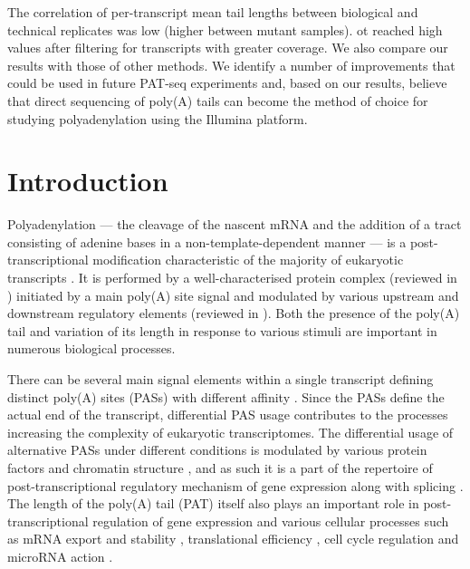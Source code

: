 \documentclass[10pt]{article}
\begin{document}
The correlation of per-transcript mean tail lengths between biological and technical replicates was low (higher between mutant samples). ot reached high values after filtering for transcripts with greater coverage. We also compare our results with those of other methods. We identify a number of improvements that could be used in future PAT-seq experiments and, based on our results, believe that direct sequencing of poly(A) tails can become the method of choice for studying polyadenylation using the Illumina platform.

\section*{Introduction}

Polyadenylation --- the cleavage of the nascent mRNA and the addition of a tract consisting of adenine bases in a non-template-dependent manner --- is a post-transcriptional modification characteristic of the majority of eukaryotic transcripts \cite{zhao99,elkon13,tian13}. It is performed by a well-characterised protein complex (reviewed in \cite{zhao99}) initiated by a main poly(A) site signal and modulated by various upstream and downstream regulatory elements (reviewed in \cite{tian11,weill12}). Both the presence of the poly(A) tail and variation of its length in response to various stimuli are important in numerous biological processes.

There can be several main signal elements within a single transcript defining distinct poly(A) sites (PASs) with different affinity \cite{tian13,elkon13}. Since the PASs define the actual end of the transcript, differential PAS usage contributes to the processes increasing the complexity of eukaryotic transcriptomes. The differential usage of alternative PASs under different conditions is modulated by various protein factors and chromatin structure \cite{tian13}, and as such it is a part of the repertoire of post-transcriptional regulatory mechanism of gene expression along with splicing \cite{licatalosi10}. The length of the poly(A) tail (PAT) itself also plays an important role in post-transcriptional regulation of gene expression and various cellular processes such as mRNA export \cite{fuke07} and stability \cite{lackner07,eckmann11,weill12}, translational efficiency \cite{weill12}, cell cycle regulation \cite{mendez01} and microRNA action \cite{moretti12}.
\end{document}
